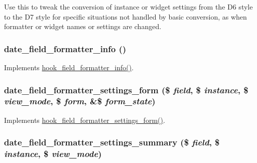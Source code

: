 Use this to tweak the conversion of instance or widget settings from the D6 style to the D7 style for specific situations not handled by basic conversion, as when formatter or widget names or settings are changed. \hypertarget{date_8field_8inc_a41de0b573e603d7d442c261660b76855}{
\subsubsection[{date\_\-field\_\-formatter\_\-info}]{\setlength{\rightskip}{0pt plus 5cm}date\_\-field\_\-formatter\_\-info ()}}
\label{date_8field_8inc_a41de0b573e603d7d442c261660b76855}
Implements \hyperlink{group__field__formatter_ga2f5aa1c7455f55dffd84a48efa57f987}{hook\_\-field\_\-formatter\_\-info()}. \hypertarget{date_8field_8inc_a224654ed8b7e1a260375ed74e5fc0d74}{
\subsubsection[{date\_\-field\_\-formatter\_\-settings\_\-form}]{\setlength{\rightskip}{0pt plus 5cm}date\_\-field\_\-formatter\_\-settings\_\-form (\$ {\em field}, \/  \$ {\em instance}, \/  \$ {\em view\_\-mode}, \/  \$ {\em form}, \/  \&\$ {\em form\_\-state})}}
\label{date_8field_8inc_a224654ed8b7e1a260375ed74e5fc0d74}
Implements \hyperlink{group__field__types_gaf9b6aefe0b4fe6c03ebd5bd9bd1b891b}{hook\_\-field\_\-formatter\_\-settings\_\-form()}. \hypertarget{date_8field_8inc_a10367ff3000283b8d15281b0340a318a}{
\subsubsection[{date\_\-field\_\-formatter\_\-settings\_\-summary}]{\setlength{\rightskip}{0pt plus 5cm}date\_\-field\_\-formatter\_\-settings\_\-summary (\$ {\em field}, \/  \$ {\em instance}, \/  \$ {\em view\_\-mode})}}
